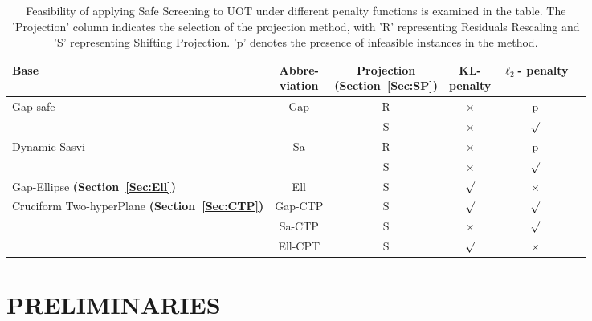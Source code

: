 \documentclass[11pt]{article}
\begin{document}
\begin{table}[t]
\caption{Feasibility of applying Safe Screening to UOT under different penalty functions is examined in the table. The 'Projection' column indicates the selection of the projection method, with 'R' representing Residuals Rescaling and 'S' representing Shifting Projection. 'p' denotes the presence of infeasible instances in the method.}
\label{sample-table}
\begin{tabular}{l||c|c|ccr}
\toprule
Base &\makecell{Abbre-\\viation} &\makecell{Projection \\ {\bf (Section~\ref{Sec:SP}) }} & \makecell{KL-\\
penalty} &\makecell{$\ell_2$-\\penalty} \\
\midrule
Gap-safe \cite{JMLR:v18:16-577} \cite{DBLP:conf/icml/AtamturkG20} & Gap & R& $\times$ & p & \\
& & S & $\times$ & $\surd$ & \\
\midrule
Dynamic Sasvi \cite{Yamada_NIPS_2021}& Sa& R& $\times$  & p &\\
&  &S & $\times$  & $\surd$ &\\
\midrule
Gap-Ellipse {\bf (Section~\ref{Sec:Ell}) }&Ell & S & $\surd$ & $\times$  &\\
\midrule
Cruciform Two-hyperPlane {\bf (Section~\ref{Sec:CTP}) }&Gap-CTP &S & $\surd$ & $\surd$ &\\
        &Sa-CTP &S & $\times$  & $\surd$ &\\
&Ell-CPT &S& $\surd$ & $\times$  &\\
\bottomrule
\end{tabular}
\label{Tab:1}
\end{table}

\section{PRELIMINARIES}
\label{sec:pre}
\end{document}
